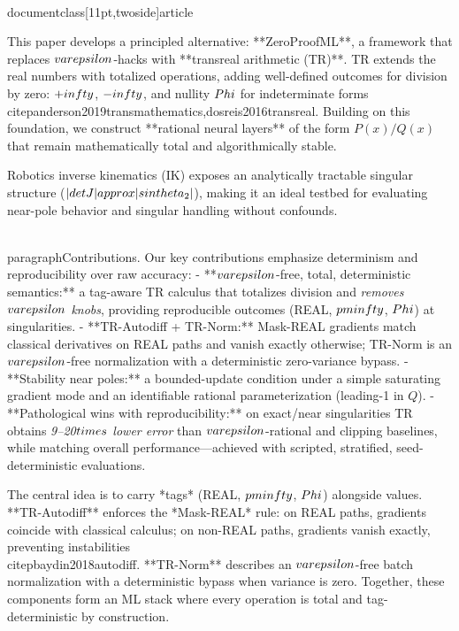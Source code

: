 \\documentclass[11pt,twoside]{article}
\begin{document}
This paper develops a principled alternative: **ZeroProofML**, a framework that replaces $\\varepsilon$-hacks with **transreal arithmetic (TR)**. TR extends the real numbers with totalized operations, adding well-defined outcomes for division by zero: $+\\infty$, $-\\infty$, and nullity $\\Phi$ for indeterminate forms \\citep{anderson2019transmathematics,dosreis2016transreal}. Building on this foundation, we construct **rational neural layers** of the form $P(x)/Q(x)$ that remain mathematically total and algorithmically stable.

Robotics inverse kinematics (IK) exposes an analytically tractable singular structure ($|\\det J|\\approx|\\sin\\theta_2|$), making it an ideal testbed for evaluating near-pole behavior and singular handling without confounds.

\\paragraph{Contributions.} Our key contributions emphasize determinism and reproducibility over raw accuracy:
- **$\\varepsilon$-free, total, deterministic semantics:** a tag-aware TR calculus that totalizes division and \emph{removes $\\varepsilon$ knobs}, providing reproducible outcomes (REAL, $\\pm\\infty$, $\\Phi$) at singularities.
- **TR-Autodiff + TR-Norm:** Mask-REAL gradients match classical derivatives on REAL paths and vanish exactly otherwise; TR-Norm is an $\\varepsilon$-free normalization with a deterministic zero-variance bypass.
- **Stability near poles:** a bounded-update condition under a simple saturating gradient mode and an identifiable rational parameterization (leading-1 in $Q$).
- **Pathological wins with reproducibility:** on exact/near singularities TR obtains \emph{9--20$\\times$ lower error} than $\\varepsilon$-rational and clipping baselines, while matching overall performance—achieved with scripted, stratified, seed-deterministic evaluations.

The central idea is to carry *tags* (REAL, $\\pm\\infty$, $\\Phi$) alongside values. **TR-Autodiff** enforces the *Mask-REAL* rule: on REAL paths, gradients coincide with classical calculus; on non-REAL paths, gradients vanish exactly, preventing instabilities \\citep{baydin2018autodiff}. **TR-Norm** describes an $\\varepsilon$-free batch normalization with a deterministic bypass when variance is zero. Together, these components form an ML stack where every operation is total and tag-deterministic by construction.
\end{document}
